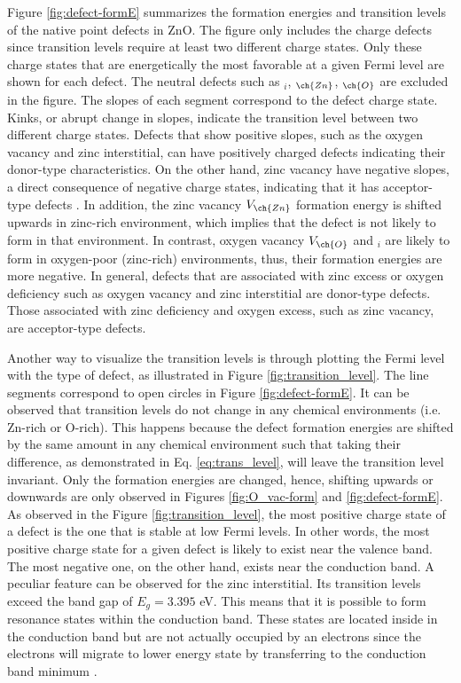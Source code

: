 Figure \ref{fig:defect-formE} summarizes the formation energies and transition levels of the native point defects in ZnO. The figure only includes the charge defects since transition levels require at least two different charge states. Only these charge states that are energetically the most favorable at a given Fermi level are shown for each defect. The neutral defects such as $_i$, $_{\ch{Zn}}$, $_{\ch{O}}$ are excluded in the figure. The slopes of each segment correspond to the defect charge state. Kinks, or abrupt change in slopes, indicate the transition level between two different charge states. Defects that show positive slopes, such as the oxygen vacancy and zinc interstitial,  can have positively charged defects indicating their donor-type characteristics. On the other hand, zinc vacancy have negative slopes, a direct consequence of negative charge states, indicating that it has acceptor-type defects \citep{Oba2011}. In addition, the zinc vacancy $V_{\ch{Zn}}$ formation energy is shifted upwards in zinc-rich environment, which implies that the defect is not likely to form in that environment. In contrast, oxygen vacancy $V_{\ch{O}}$ and $_i$ are likely to form in oxygen-poor (zinc-rich) environments, thus, their formation energies are more negative. In general, defects that are associated with zinc excess or oxygen deficiency such as oxygen vacancy and zinc interstitial are donor-type defects. Those associated with zinc deficiency and oxygen excess, such as zinc vacancy, are acceptor-type defects.

Another way to visualize the transition levels is through plotting the Fermi level with the type of defect, as illustrated in Figure \ref{fig:transition_level}. The line segments correspond to open circles in Figure \ref{fig:defect-formE}. It can be observed that transition levels do not change in any chemical environments (i.e. Zn-rich or O-rich). This happens because the defect formation energies are shifted by the same amount  in any chemical environment such that taking their difference, as demonstrated in Eq. \eqref{eq:trans_level}, will leave the transition level invariant. Only the formation energies are changed, hence, shifting upwards or downwards are only observed in Figures \ref{fig:O_vac-form} and \ref{fig:defect-formE}. As observed in the Figure \ref{fig:transition_level}, the most positive charge state of a defect is the one that is stable at low Fermi levels. In other words, the most positive charge state for a given defect is likely to exist near the valence band. The most negative one, on the other hand, exists near the conduction band. A peculiar feature can be observed for the zinc interstitial. Its transition levels exceed the band gap of $E_g = 3.395$ eV. This means that it is possible to form resonance states within the conduction band. These states are located inside in the conduction band but are not actually occupied by an electrons since the electrons will migrate to lower energy state by transferring to the conduction band minimum \citep{Freysoldt2014}.

